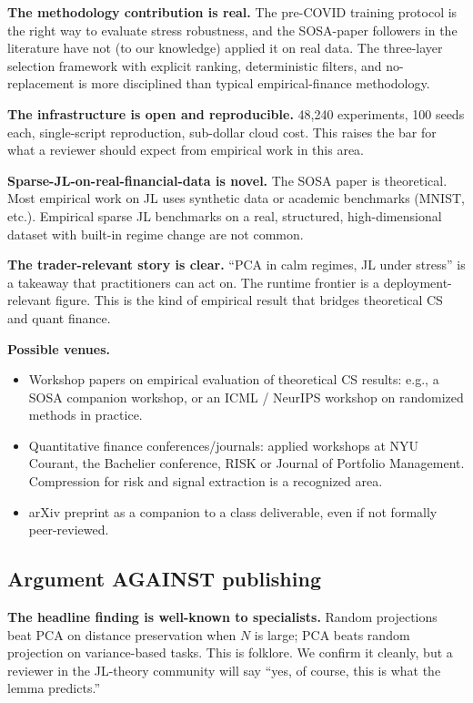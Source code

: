 \documentclass[11pt]{article}
\begin{document}
\textbf{The methodology contribution is real.} The pre-COVID training protocol is the right way to evaluate stress robustness, and the SOSA-paper followers in the literature have not (to our knowledge) applied it on real data. The three-layer selection framework with explicit ranking, deterministic filters, and no-replacement is more disciplined than typical empirical-finance methodology.

\textbf{The infrastructure is open and reproducible.} 48{,}240 experiments, 100 seeds each, single-script reproduction, sub-dollar cloud cost. This raises the bar for what a reviewer should expect from empirical work in this area.

\textbf{Sparse-JL-on-real-financial-data is novel.} The SOSA paper is theoretical. Most empirical work on JL uses synthetic data or academic benchmarks (MNIST, etc.). Empirical sparse JL benchmarks on a real, structured, high-dimensional dataset with built-in regime change are not common.

\textbf{The trader-relevant story is clear.} ``PCA in calm regimes, JL under stress'' is a takeaway that practitioners can act on. The runtime frontier is a deployment-relevant figure. This is the kind of empirical result that bridges theoretical CS and quant finance.

\textbf{Possible venues.}
\begin{itemize}
    \item Workshop papers on empirical evaluation of theoretical CS results: e.g., a SOSA companion workshop, or an ICML / NeurIPS workshop on randomized methods in practice.
    \item Quantitative finance conferences/journals: applied workshops at NYU Courant, the Bachelier conference, RISK or Journal of Portfolio Management. Compression for risk and signal extraction is a recognized area.
    \item arXiv preprint as a companion to a class deliverable, even if not formally peer-reviewed.
\end{itemize}

\subsection{Argument AGAINST publishing}

\textbf{The headline finding is well-known to specialists.} Random projections beat PCA on distance preservation when $N$ is large; PCA beats random projection on variance-based tasks. This is folklore. We confirm it cleanly, but a reviewer in the JL-theory community will say ``yes, of course, this is what the lemma predicts.''
\end{document}
